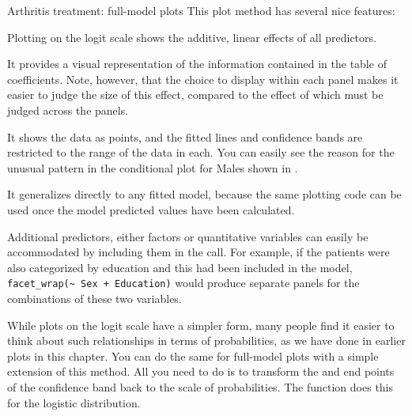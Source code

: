 \documentclass[11pt]{book}
\renewenvironment{knitrout}{\small\renewcommand{\baselinestretch}{.85}}{} %
\begin{document}
\begin{Example}{Arthritis treatment: full-model plots}
\begin{knitrout}
\end{knitrout}
This plot method has several nice features:
\begin{itemize*}
  \item Plotting on the logit scale shows the additive, linear effects of all predictors.
  \item It provides a visual representation of the information contained in the table of
  coefficients.  Note, however, that the choice to display  within each
  panel makes it easier to judge the size of this effect, compared to the effect of
   which must be judged across the panels.
  \item It shows the data as points, and the fitted lines and confidence bands are restricted
  to the range of the data in each.  You can easily see the reason for the unusual
  pattern in the conditional plot for Males shown in .
  \item It generalizes directly to any fitted model, because the same plotting code can
  be used once the model predicted values have been calculated.
  \item Additional predictors, either factors or quantitative variables can easily be
  accommodated by including them in the  call.  For example, if the
  patients were also categorized by education and this had been included in the model,
  \verb|facet_wrap(~ Sex + Education)| would produce separate panels for the combinations
  of these two variables.
\end{itemize*}

While plots on the logit scale have a simpler form, many people find it easier to think
about such relationships in terms of probabilities, as we have done in earlier plots
in this chapter.  You can do the same for full-model plots with a simple extension
of this method.  All you need to do is to transform the  and
end points of the confidence band back to the scale of probabilities.
The  function  does this for the logistic
distribution.


\end{Example}
\end{document}
